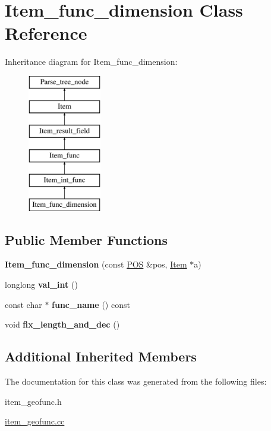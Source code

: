 \hypertarget{classItem__func__dimension}{}\section{Item\+\_\+func\+\_\+dimension Class Reference}
\label{classItem__func__dimension}
Inheritance diagram for Item\+\_\+func\+\_\+dimension\+:\begin{figure}[H]
\begin{center}
\leavevmode
\includegraphics[height=6.000000cm]{classItem__func__dimension}
\end{center}
\end{figure}
\subsection*{Public Member Functions}
\begin{DoxyCompactItemize}
\item 
\mbox{\label{classItem__func__dimension_ab6e01694876f65e758b021bcd13ad5c6}} 
{\bfseries Item\+\_\+func\+\_\+dimension} (const \mbox{\hyperlink{structYYLTYPE}{P\+OS}} \&pos, \mbox{\hyperlink{classItem}{Item}} $\ast$a)
\item 
\mbox{\label{classItem__func__dimension_a1d0dab10f9b300647636e3e9ee89a5f5}} 
longlong {\bfseries val\+\_\+int} ()
\item 
\mbox{\label{classItem__func__dimension_aed74f767379f5225f6828e6f36017c2f}} 
const char $\ast$ {\bfseries func\+\_\+name} () const
\item 
\mbox{\label{classItem__func__dimension_a6d22dc422d7a8d5773b81688fd5a45e8}} 
void {\bfseries fix\+\_\+length\+\_\+and\+\_\+dec} ()
\end{DoxyCompactItemize}
\subsection*{Additional Inherited Members}


The documentation for this class was generated from the following files\+:\begin{DoxyCompactItemize}
\item 
item\+\_\+geofunc.\+h\item 
\mbox{\hyperlink{item__geofunc_8cc}{item\+\_\+geofunc.\+cc}}\end{DoxyCompactItemize}

